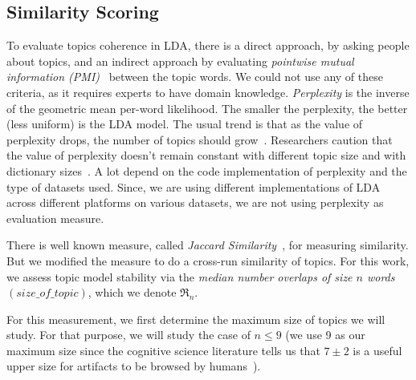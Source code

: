 \documentclass[twocolumn,5p,sort&compress]{elsarticle}
\theoremstyle{break}
\begin{document}
\subsection{Similarity Scoring}
To evaluate topics coherence in LDA, there is a direct approach, by asking people about topics, and an indirect approach by evaluating \textit{pointwise mutual information (PMI)}~\cite{lau2014machine, o2015analysis} between the topic words. We could not use any of these criteria, as it requires experts to have domain knowledge. \textit{Perplexity} is  the inverse of the geometric mean per-word likelihood. The smaller the perplexity, the better (less uniform) is the LDA model. The usual trend is that as the value of perplexity drops, the number of topics should grow~\cite{koltcov2014latent}. Researchers caution that the value of perplexity doesn't remain constant with different topic size and with dictionary sizes~\cite{ zhao2015heuristic}. A lot depend on the code implementation of perplexity and the type of datasets used. Since, we are using different implementations of LDA across different platforms on various datasets, we are not using perplexity as evaluation measure.

There is well known measure, called \textit{Jaccard Similarity}~\cite{o2015analysis, galvis2013analysis}, for measuring similarity. But we modified the measure to do a cross-run similarity of topics. For this work, we assess topic model stability via the {\em median number overlaps of size $n$ words $\mathit{(size\_of\_topic)}$}, which we denote $\Re_n$.

 


For this measurement, we first determine the maximum size of topics we will study. For that purpose,
we will study the case of $n \le 9$ (we use 9 as our maximum size since the cognitive
science literature tells us that $7\pm 2$ is a useful upper size for artifacts to be browsed by humans~\cite{miller1956magical}).
\end{document}
